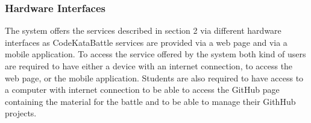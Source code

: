 \subsubsection{Hardware Interfaces}
The system offers the services described in section 2 via different hardware interfaces as CodeKataBattle services are provided via a web page and via a mobile application.
To access the service offered by the system both kind of users are required to have either a device with an internet connection, to access the web page, or the mobile application.
Students are also required to have access to a computer with internet connection to be able to access the GitHub page containing the material for the battle and to be able to manage their GithHub projects.
